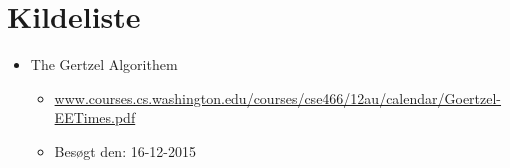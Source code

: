 \section{Kildeliste}

\begin{itemize}
  \item The Gertzel Algorithem
  \begin{itemize}
    \item \url{www.courses.cs.washington.edu/courses/cse466/12au/calendar/Goertzel-EETimes.pdf}
    \item Besøgt den: 16-12-2015
  \end{itemize}
\end{itemize}